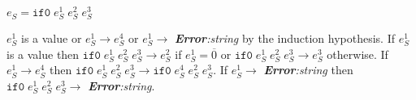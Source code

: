\begin{case}
$e_{S}=\mathtt{if0}\;e_{S}^{1}\;e_{S}^{2}\;e_{S}^{3}$

$e_{S}^{1}$ is a value or $e_{S}^{1}\rightarrow e_{S}^{4}$ or $e_{S}^{1}\rightarrow$ \emph{\textbf{Error}:\;string} by the induction hypothesis.  If $e_{S}^{1}$ is a value then $\mathtt{if0}\;e_{S}^{1}\;e_{S}^{2}\;e_{S}^{3}\rightarrow e_{S}^{2}$ if $e_{S}^{1}=\overline{0}$ or $\mathtt{if0}\;e_{S}^{1}\;e_{S}^{2}\;e_{S}^{3}\rightarrow e_{S}^{3}$ otherwise.  If $e_{S}^{1}\rightarrow e_{S}^{4}$ then $\mathtt{if0}\;e_{S}^{1}\;e_{S}^{2}\;e_{S}^{3}\rightarrow \mathtt{if0}\;e_{S}^{4}\;e_{S}^{2}\;e_{S}^{3}$.  If $e_{S}^{1}\rightarrow$ \emph{\textbf{Error}:\;string} then $\mathtt{if0}\;e_{S}^{1}\;e_{S}^{2}\;e_{S}^{3}\rightarrow$ \emph{\textbf{Error}:\;string}.
\end{case}